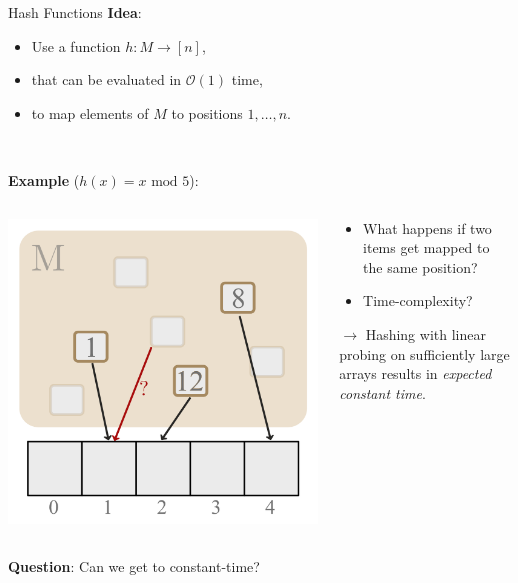 \documentclass[10pt]{beamer}
\begin{document}
\begin{frame}[fragile]{Hash Functions}
    \textbf{Idea}:
    \vspace{-.75em}
    \begin{itemize}
        \item Use a function $ h : M \to [n] $,
        \item that can be evaluated in $ \mathcal{O}(1) $ time,
        \item to map elements of $ M $ to positions $ 1, \dots, n $.
    \end{itemize}
    \\
    \vfill

    \textbf{Example} ($ h(x) = x \text{ mod } 5 $):
    \begin{columns}[T]
    \begin{column}{.3\textwidth}
        \includegraphics[height=.5\textheight]{Images/Hashing/Hashing_02}
    \end{column}

    \begin{column}{.5\textwidth}
        \begin{itemize}
            \item What happens if two items get mapped to the same position? \pause
            \item Time-complexity? \pause
        \end{itemize}
        \vspace{3em}
        $ \to $ Hashing with linear probing on sufficiently large arrays results in \textit{expected constant time}. \pause
    \end{column}
    \end{columns}

    \textbf{Question}: Can we get to constant-time?
\end{frame}
\end{document}
